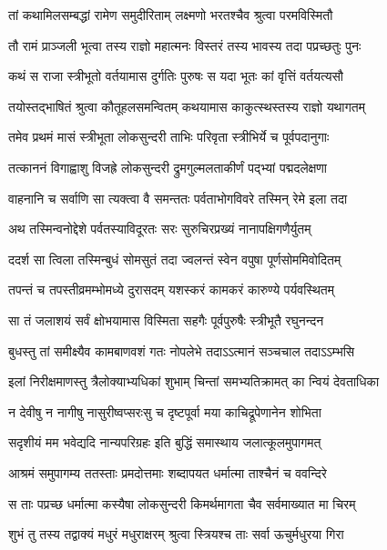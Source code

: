 
\twolineshloka
{तां कथामिलसम्बद्धां रामेण समुदीरिताम्}
{लक्ष्मणो भरतश्चैव श्रुत्वा परमविस्मितौ} %

\twolineshloka
{तौ रामं प्राञ्जली भूत्वा तस्य राज्ञो महात्मनः}
{विस्तरं तस्य भावस्य तदा पप्रच्छतुः पुनः} %

\twolineshloka
{कथं स राजा स्त्रीभूतो वर्तयामास दुर्गतिः}
{पुरुषः स यदा भूतः कां वृत्तिं वर्तयत्यसौ} %

\twolineshloka
{तयोस्तद्भाषितं श्रुत्वा कौतूहलसमन्वितम्}
{कथयामास काकुत्स्थस्तस्य राज्ञो यथागतम्} %

\twolineshloka
{तमेव प्रथमं मासं स्त्रीभूता लोकसुन्दरी}
{ताभिः परिवृता स्त्रीभिर्ये च पूर्वपदानुगाः} %

\twolineshloka
{तत्काननं विगाह्वाशु विजह्रे लोकसुन्दरी}
{द्रुमगुल्मलताकीर्णं पद्भ्यां पद्मदलेक्षणा} %

\twolineshloka
{वाहनानि च सर्वाणि सा त्यक्त्वा वै समन्ततः}
{पर्वताभोगविवरे तस्मिन् रेमे इला तदा} %

\twolineshloka
{अथ तस्मिन्वनोद्देशे पर्वतस्याविदूरतः}
{सरः सुरुचिरप्रख्यं नानापक्षिगणैर्युतम्} %

\twolineshloka
{ददर्श सा त्विला तस्मिन्बुधं सोमसुतं तदा}
{ज्वलन्तं स्वेन वपुषा पूर्णसोममिवोदितम्} %

\twolineshloka
{तपन्तं च तपस्तीव्रमम्भोमध्ये दुरासदम्}
{यशस्करं कामकरं कारुण्ये पर्यवस्थितम्} %

\twolineshloka
{सा तं जलाशयं सर्वं क्षोभयामास विस्मिता}
{सहगैः पूर्वपुरुषैः स्त्रीभूतै रघुनन्दन} %

\twolineshloka
{बुधस्तु तां समीक्ष्यैव कामबाणवशं गतः}
{नोपलेभे तदाऽऽत्मानं सञ्चचाल तदाऽऽम्भसि} %

\twolineshloka
{इलां निरीक्षमाणस्तु त्रैलोक्याभ्यधिकां शुभाम्}
{चिन्तां समभ्यतिक्रामत् का न्वियं देवताधिका} %

\twolineshloka
{न देवीषु न नागीषु नासुरीष्वप्सरःसु च}
{दृष्टपूर्वा मया काचिद्रूपेणानेन शोभिता} %

\twolineshloka
{सदृशीयं मम भवेद्यदि नान्यपरिग्रहः}
{इति बुद्धिं समास्थाय जलात्कूलमुपागमत्} %

\twolineshloka
{आश्रमं समुपागम्य ततस्ताः प्रमदोत्तमाः}
{शब्दापयत धर्मात्मा ताश्चैनं च ववन्दिरे} %

\twolineshloka
{स ताः पप्रच्छ धर्मात्मा कस्यैषा लोकसुन्दरी}
{किमर्थमागता चैव सर्वमाख्यात मा चिरम्} %

\twolineshloka
{शुभं तु तस्य तद्वाक्यं मधुरं मधुराक्षरम्}
{श्रुत्वा स्त्रियश्च ताः सर्वा ऊचुर्मधुरया गिरा} %

